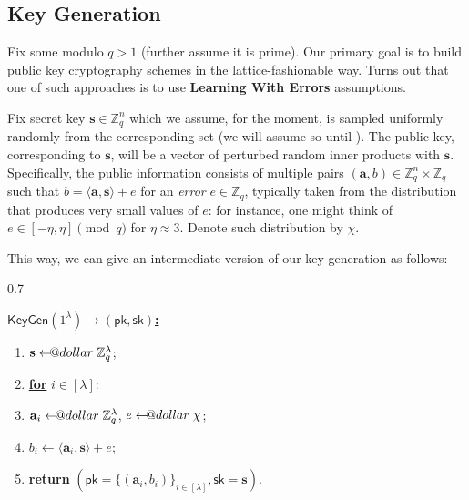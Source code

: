 \documentclass{template}
\makeatletter
\newcommand\leftarrowS{\leftarrow\joinrel\smalldollar}
\newcommand{\smalldollar}{\mathrel{\mathpalette\small@dollar\relax}}
\newcommand{\small@dollar}[2]{%
  \vcenter{\hbox{%
    $#1\textnormal{\fontsize{0.7\dimexpr\f@size pt}{0}\selectfont\$}$%
  }}%
}
\makeatother
\begin{document}
\subsection{Key Generation}

Fix some modulo $q>1$ (further assume it is prime). Our primary goal is to build
public key cryptography schemes in the lattice-fashionable way. Turns out that
one of such approaches is to use \textbf{Learning With Errors} assumptions.

Fix secret key $\mathbf{s} \in \mathbb{Z}_q^n$ which we assume, for the moment,
is sampled uniformly randomly from the corresponding set (we will assume so
until ). The public key, corresponding to $\mathbf{s}$, will
be a vector of perturbed random inner products with $\mathbf{s}$. Specifically,
the public information consists of multiple pairs $(\mathbf{a}, b) \in
\mathbb{Z}_q^{n} \times \mathbb{Z}_q$ such that $b =
\langle\mathbf{a},\mathbf{s}\rangle + e$ for an \textit{error} $e \in
\mathbb{Z}_q$, typically taken from the distribution that produces very small
values of $e$: for instance, one might think of $e \in [-\eta,\eta]\pmod{q}$ for
$\eta \approx 3$. Denote such distribution by $\chi$.

This way, we can give an intermediate version of our key generation as follows:

\begin{center}
\begin{varwidth}{0.7\linewidth}
\begin{mdframed}[linecolor=black,
                 linewidth=1.0pt,
                 skipabove=10pt,
                 skipbelow=10pt,
                 leftmargin=0pt,
                 rightmargin=0pt]
\colorbox{purple!10}{\underline{\textbf{$\mathsf{KeyGen}(1^{\lambda}) \to (\mathsf{pk},\mathsf{sk})$:}}}

\begin{enumerate}
    \item $\mathbf{s} \leftarrowS \mathbb{Z}_q^{\lambda}$; 
    \item \underline{\textbf{for}} $i \in [\lambda]$:
    \item \hspace{10px} $\mathbf{a}_i \leftarrowS \mathbb{Z}_q^{\lambda}$, $e \leftarrowS \chi$;
    \item \hspace{10px} $b_i \gets \langle\mathbf{a}_i,\mathbf{s}\rangle + e$;\hspace{5px}{\footnotesize\texttt{\textcolor{gray!70!black}{// Generate random pertubation}}}
    \item \textbf{return} $(\mathsf{pk}=\{(\mathbf{a}_i, b_i)\}_{i \in [\lambda]}, \mathsf{sk}=\mathbf{s})$.
\end{enumerate}
\end{mdframed}
\end{varwidth}
\end{center}
\end{document}
